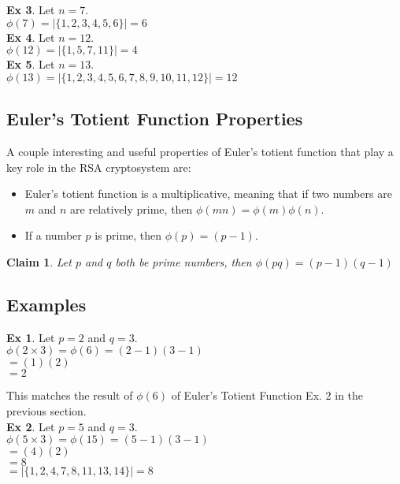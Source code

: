 \documentclass[twoside]{article}
\newtheorem{claim}[theorem]{Claim}
\begin{document}
\textbf{Ex 3}. Let $n = 7$.\\
$\phi(7) = | \{1, 2, 3, 4, 5, 6\} | = 6$\\

\textbf{Ex 4}. Let $n = 12$.\\
$\phi(12) = | \{1, 5, 7, 11\} | = 4$\\

\textbf{Ex 5}. Let $n = 13$.\\
$\phi(13) = | \{1, 2, 3, 4, 5, 6, 7, 8, 9, 10, 11, 12\} | = 12$\\

\subsection{Euler's Totient Function Properties}
A couple interesting and useful properties of Euler's totient function that play a key role in the RSA cryptosystem are:

\begin{itemize}
\item Euler's totient function is a multiplicative, meaning that if two numbers are $m$ and $n$ are relatively prime, then $\phi(mn) = \phi(m)\phi(n).$
\item If a number $p$ is prime, then $\phi(p) = (p-1).$
\end{itemize}

\begin{claim}
Let $p$ and $q$ both be prime numbers, then
$\phi(pq) = (p - 1)(q - 1)$
\end{claim}

\subsection{Examples}

\textbf{Ex 1}. Let $p = 2$ and $q = 3$.\\
$\phi(2 \times 3) = \phi(6) = (2 - 1)(3 -1)$\\
\hspace*{24mm} $= (1)(2)$ \\
\hspace*{24mm} $= 2$

This matches the result of $\phi(6)$ of Euler's Totient Function Ex. 2 in the previous section. \\

\textbf{Ex 2}. Let $p = 5$ and $q = 3$.\\
$\phi(5 \times 3) = \phi(15) = (5 - 1)(3 -1)$\\
\hspace*{26mm} $= (4)(2)$ \\
\hspace*{26mm} $= 8$ \\
\hspace*{26mm} $= |\{1, 2, 4, 7, 8, 11, 13, 14\}| = 8$
\end{document}
